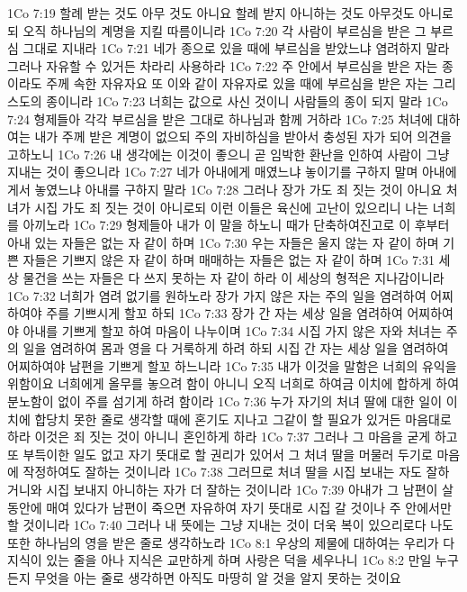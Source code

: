 1Co 7:19  할례 받는 것도 아무 것도 아니요 할례 받지 아니하는 것도 아무것도 아니로되 오직 하나님의 계명을 지킬 따름이니라
1Co 7:20  각 사람이 부르심을 받은 그 부르심 그대로 지내라
1Co 7:21  네가 종으로 있을 때에 부르심을 받았느냐 염려하지 말라 그러나 자유할 수 있거든 차라리 사용하라
1Co 7:22  주 안에서 부르심을 받은 자는 종이라도 주께 속한 자유자요 또 이와 같이 자유자로 있을 때에 부르심을 받은 자는 그리스도의 종이니라
1Co 7:23  너희는 값으로 사신 것이니 사람들의 종이 되지 말라
1Co 7:24  형제들아 각각 부르심을 받은 그대로 하나님과 함께 거하라
1Co 7:25  처녀에 대하여는 내가 주께 받은 계명이 없으되 주의 자비하심을 받아서 충성된 자가 되어 의견을 고하노니
1Co 7:26  내 생각에는 이것이 좋으니 곧 임박한 환난을 인하여 사람이 그냥 지내는 것이 좋으니라
1Co 7:27  네가 아내에게 매였느냐 놓이기를 구하지 말며 아내에게서 놓였느냐 아내를 구하지 말라
1Co 7:28  그러나 장가 가도 죄 짓는 것이 아니요 처녀가 시집 가도 죄 짓는 것이 아니로되 이런 이들은 육신에 고난이 있으리니 나는 너희를 아끼노라
1Co 7:29  형제들아 내가 이 말을 하노니 때가 단축하여진고로 이 후부터 아내 있는 자들은 없는 자 같이 하며
1Co 7:30  우는 자들은 울지 않는 자 같이 하며 기쁜 자들은 기쁘지 않은 자 같이 하며 매매하는 자들은 없는 자 같이 하며
1Co 7:31  세상 물건을 쓰는 자들은 다 쓰지 못하는 자 같이 하라 이 세상의 형적은 지나감이니라
1Co 7:32  너희가 염려 없기를 원하노라 장가 가지 않은 자는 주의 일을 염려하여 어찌하여야 주를 기쁘시게 할꼬 하되
1Co 7:33  장가 간 자는 세상 일을 염려하여 어찌하여야 아내를 기쁘게 할꼬 하여 마음이 나누이며
1Co 7:34  시집 가지 않은 자와 처녀는 주의 일을 염려하여 몸과 영을 다 거룩하게 하려 하되 시집 간 자는 세상 일을 염려하여 어찌하여야 남편을 기쁘게 할꼬 하느니라
1Co 7:35  내가 이것을 말함은 너희의 유익을 위함이요 너희에게 올무를 놓으려 함이 아니니 오직 너희로 하여금 이치에 합하게 하여 분노함이 없이 주를 섬기게 하려 함이라
1Co 7:36  누가 자기의 처녀 딸에 대한 일이 이치에 합당치 못한 줄로 생각할 때에 혼기도 지나고 그같이 할 필요가 있거든 마음대로 하라 이것은 죄 짓는 것이 아니니 혼인하게 하라
1Co 7:37  그러나 그 마음을 굳게 하고 또 부득이한 일도 없고 자기 뜻대로 할 권리가 있어서 그 처녀 딸을 머물러 두기로 마음에 작정하여도 잘하는 것이니라
1Co 7:38  그러므로 처녀 딸을 시집 보내는 자도 잘하거니와 시집 보내지 아니하는 자가 더 잘하는 것이니라
1Co 7:39  아내가 그 남편이 살 동안에 매여 있다가 남편이 죽으면 자유하여 자기 뜻대로 시집 갈 것이나 주 안에서만 할 것이니라
1Co 7:40  그러나 내 뜻에는 그냥 지내는 것이 더욱 복이 있으리로다 나도 또한 하나님의 영을 받은 줄로 생각하노라
1Co 8:1  우상의 제물에 대하여는 우리가 다 지식이 있는 줄을 아나 지식은 교만하게 하며 사랑은 덕을 세우나니
1Co 8:2  만일 누구든지 무엇을 아는 줄로 생각하면 아직도 마땅히 알 것을 알지 못하는 것이요
